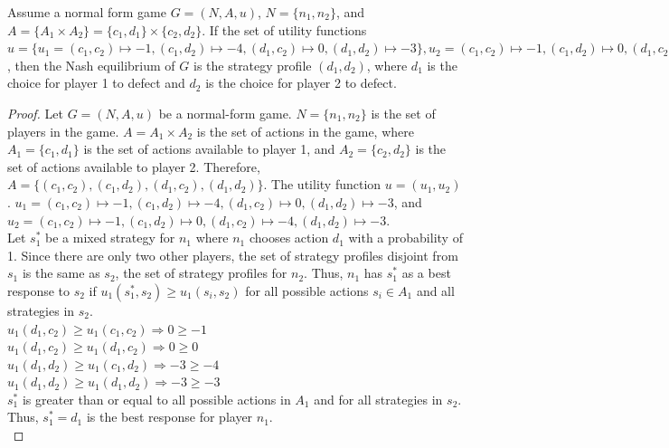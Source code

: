 \begin{thm}
  Assume a normal form game $G = (N, A, u)$, $N=\{n_1, n_2\}$, and $A=\{A_1\times A_2\} = \{c_1, d_1\}\times\{c_2, d_2\}$. If the set of utility functions $u = \{u_1=(c_1, c_2)\mapsto -1, (c_1, d_2)\mapsto -4, (d_1, c_2)\mapsto 0, (d_1, d_2)\mapsto -3\}, u_2=(c_1, c_2)\mapsto -1, (c_1, d_2)\mapsto 0, (d_1, c_2)\mapsto -4, (d_1, d_2)\mapsto -3$, then the Nash equilibrium of $G$ is the strategy profile $(d_1, d_2)$, where $d_1$ is the choice for player 1 to defect and $d_2$ is the choice for player 2 to defect.
\end{thm}
\begin{proof}
  Let $G=(N, A, u)$ be a normal-form game. $N = \{n_1, n_2\}$ is the set of players in the game. $A=A_1\times A_2$ is the set of actions in the game, where $A_1=\{c_1, d_1\}$ is the set of actions available to player 1, and $A_2=\{c_2, d_2\}$ is the set of actions available to player 2. Therefore, $A=\{(c_1, c_2), (c_1, d_2), (d_1, c_2), (d_1, d_2)\}$. The utility function $u=(u_1, u_2)$. $u_1=(c_1, c_2)\mapsto -1, (c_1, d_2)\mapsto -4, (d_1, c_2)\mapsto 0, (d_1, d_2)\mapsto -3$, and $u_2=(c_1, c_2)\mapsto -1, (c_1, d_2)\mapsto 0, (d_1, c_2)\mapsto -4, (d_1, d_2)\mapsto -3$.\\

  Let $s^*_1$ be a mixed strategy for $n_1$ where $n_1$ chooses action $d_1$ with a probability of 1. Since there are only two other players, the set of strategy profiles disjoint from $s_1$ is the same as $s_2$, the set of strategy profiles for $n_2$. Thus, $n_1$ has $s^*_1$ as a best response to $s_2$ if $u_1(s^*_1, s_2)\ge u_1(s_i, s_2)$ for all possible actions $s_i\in A_1$ and all strategies in $s_2$.\\
  
  $u_1(d_1, c_2)\ge u_1(c_1, c_2) \Rightarrow 0\ge -1$\\
  
  $u_1(d_1, c_2)\ge u_1(d_1, c_2) \Rightarrow 0\ge 0$\\

  $u_1(d_1, d_2)\ge u_1(c_1, d_2) \Rightarrow -3\ge -4$\\

  $u_1(d_1, d_2)\ge u_1(d_1, d_2) \Rightarrow -3\ge -3$\\

  $s^*_1$ is greater than or equal to all possible actions in $A_1$ and for all strategies in $s_2$. Thus, $s^*_1=d_1$ is the best response for player $n_1$.\\


\end{proof}
